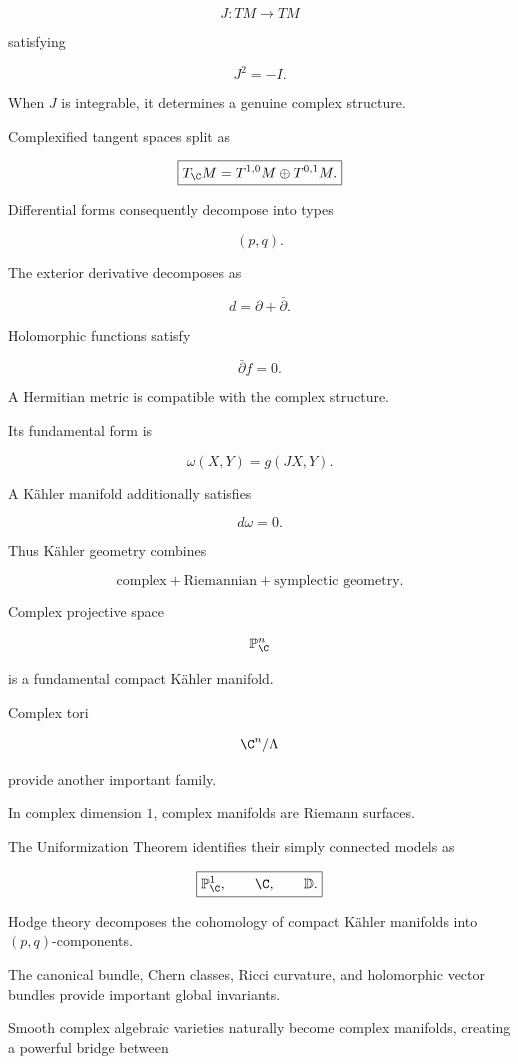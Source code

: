 \[
\boxed{
J:TM\to TM
}
\]

satisfying

\[
\boxed{J^2=-I.}
\]

When \(J\) is integrable, it determines a genuine complex structure.

Complexified tangent spaces split as

\[
\boxed{
T_{\C}M
=
T^{1,0}M
\oplus
T^{0,1}M.
}
\]

Differential forms consequently decompose into types

\[
\boxed{(p,q).}
\]

The exterior derivative decomposes as

\[
\boxed{
d=\partial+\bar{\partial}.
}
\]

Holomorphic functions satisfy

\[
\boxed{
\bar{\partial}f=0.
}
\]

A Hermitian metric is compatible with the complex structure.

Its fundamental form is

\[
\boxed{
\omega(X,Y)=g(JX,Y).
}
\]

A K\"ahler manifold additionally satisfies

\[
\boxed{d\omega=0.}
\]

Thus K\"ahler geometry combines

\[
\boxed{
\text{complex}
+
\text{Riemannian}
+
\text{symplectic geometry}.
}
\]

Complex projective space

\[
\mathbb{P}^n_{\C}
\]

is a fundamental compact K\"ahler manifold.

Complex tori

\[
\C^n/\Lambda
\]

provide another important family.

In complex dimension \(1\), complex manifolds are Riemann surfaces.

The Uniformization Theorem identifies their simply connected models as

\[
\boxed{
\mathbb{P}^1_{\C},
\qquad
\C,
\qquad
\mathbb{D}.
}
\]

Hodge theory decomposes the cohomology of compact K\"ahler manifolds into
\((p,q)\)-components.

The canonical bundle, Chern classes, Ricci curvature, and holomorphic vector
bundles provide important global invariants.

Smooth complex algebraic varieties naturally become complex manifolds,
creating a powerful bridge between

